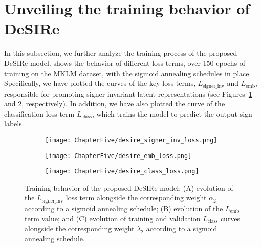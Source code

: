 \section{Unveiling the training behavior of DeSIRe}
\label{sec:desire_training_behav}
In this subsection, we further analyze the training process of the proposed DeSIRe model.  shows the behavior of different loss terms, over 150 epochs of training on the MKLM dataset, with the sigmoid annealing schedules in place. Specifically, we have plotted the curves of the key loss terms, $L_{\text{signer\_inv}}$ and $L_{\text{emb}}$, responsible for promoting signer-invariant latent representations (see Figures~\ref{fig:signer_inv_curve} and \ref{fig:emb_loss_curve}, respectively). In addition, we have also plotted the curve of the classification loss term $L_{\text{class}}$, which trains the model to predict the output sign labels.

\begin{figure}
    \centering
    \begin{subfigure}{0.325\textwidth}
        \centering
        \texttt{[image: ChapterFive/desire\_signer\_inv\_loss.png]}
        \caption{}
        \label{fig:signer_inv_curve}
    \end{subfigure}
    \hfill
    \begin{subfigure}{0.325\textwidth}
        \centering
        \texttt{[image: ChapterFive/desire\_emb\_loss.png]}
        \caption{}
        \label{fig:emb_loss_curve}
    \end{subfigure}
    \hfill
    \begin{subfigure}{0.325\textwidth}
        \centering
        \texttt{[image: ChapterFive/desire\_class\_loss.png]}
        \caption{}
        \label{fig:class_loss_curve}
    \end{subfigure}
    \caption{Training behavior of the proposed DeSIRe model: (A) evolution of the $L_{\text{signer\_inv}}$ loss term alongside the corresponding weight $\alpha_{2}$ according to a sigmoid annealing schedule; (B) evolution of the $L_{\text{emb}}$ term value; and (C) evolution of training and validation $L_{\text{class}}$ curves alongside the corresponding weight $\lambda_{2}$ according to a sigmoid annealing schedule.}
    \label{fig:desire_loss_curves}
\end{figure}

